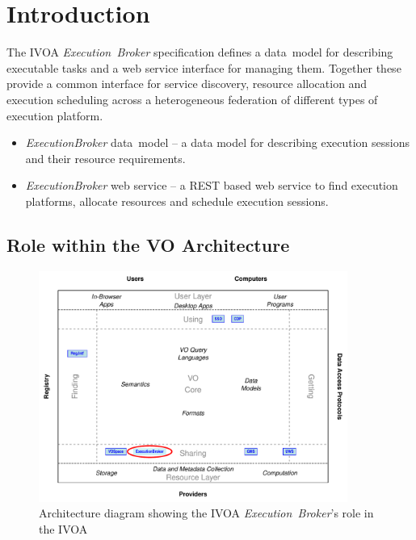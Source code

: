 \documentclass[11pt,a4paper]{ivoa}
\newcommand{\rest} {REST}
\newcommand{\datamodel} {data~model}
\newcommand{\webservice} {web service}
\newcommand{\ivoa} {IVOA}
\newcommand{\execbrokerclass} {\textit{ExecutionBroker}}
\newcommand{\executionbroker} {\textit{Execution~Broker}}
\begin{document}
\section{Introduction}
\label{introduction}

The \ivoa{} \executionbroker{} specification defines a \datamodel{} for describing executable tasks
and a \webservice{} interface for managing them.
Together these provide a common interface for service discovery, resource allocation
and execution scheduling across a heterogeneous federation of different types of
execution platform.

\begin{itemize}
    \item \execbrokerclass{} \datamodel{}  – a data model for describing execution sessions and their resource requirements.
    \item \execbrokerclass{} \webservice{} – a \rest{} based web service to find execution platforms, allocate resources and schedule execution sessions.
\end{itemize}

\subsection{Role within the VO Architecture}
\label{subsec:ivoarole}

\begin{figure}
\centering
\includegraphics[width=0.9\textwidth]{role_diagram.pdf}
\caption{Architecture diagram showing the \ivoa{} \executionbroker{}'s role in the \ivoa}
\label{fig:archdiag}
\end{figure}
\end{document}
